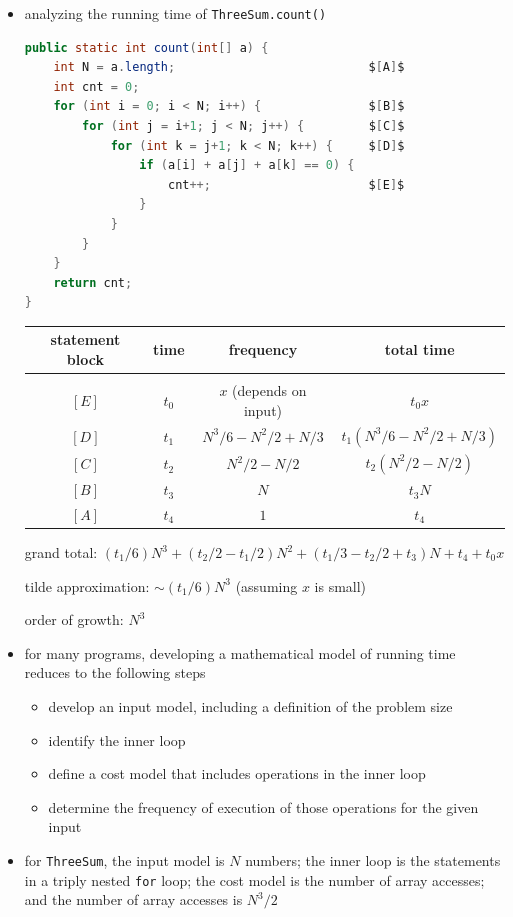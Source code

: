 \documentclass[8pt,a4paper,compress]{beamer}
\begin{document}
\begin{frame}[fragile]
\begin{itemize}
\item analyzing the running time of \lstinline{ThreeSum.count()}
\begin{lstlisting}[language=Java, mathescape]
public static int count(int[] a) {
    int N = a.length;                           $[A]$
    int cnt = 0;
    for (int i = 0; i < N; i++) {               $[B]$ 
        for (int j = i+1; j < N; j++) {         $[C]$
            for (int k = j+1; k < N; k++) {     $[D]$
                if (a[i] + a[j] + a[k] == 0) {
                    cnt++;                      $[E]$
                }
            }
        }
    }
    return cnt;
}
\end{lstlisting}
\begin{center}
\begin{tabular}{cccc}
\textbf{statement block} & \textbf{time} & \textbf{frequency} & \textbf{total time}\\ \hline \\
$[E]$ & $t_0$ & $x$ (depends on input) & $t_0x$ \\
$[D]$ & $t_1$ & $N^3/6-N^2/2+N/3$  & $t_1(N^3/6-N^2/2+N/3)$ \\
$[C]$ & $t_2$ & $N^2/2-N/2$  & $t_2(N^2/2-N/2)$ \\
$[B]$ & $t_3$ & $N$  & $t_3N$ \\
$[A]$ & $t_4$ & $1$  & $t_4$ 
\end{tabular} 
\end{center}
grand total: $(t_1/6)N^3+(t_2/2-t_1/2)N^2+(t_1/3-t_2/2+t_3)N+t_4+t_0x$

tilde approximation: $\sim(t_1/6)N^3$ (assuming $x$ is small)

order of growth: $N^3$
\end{itemize}
\end{frame}

\begin{frame}[fragile]
\begin{itemize}
\item for many programs, developing a mathematical model of running time reduces to the following steps
\begin{itemize}
\item develop an input model, including a definition of the problem size
\item identify the inner loop
\item define a cost model that includes operations in the inner loop
\item determine the frequency of execution of those operations for the given input
\end{itemize}

\item for \lstinline{ThreeSum}, the input model is $N$ numbers; the inner loop is the statements in a triply nested \lstinline{for} loop; the cost model is the number of array accesses; and the number of array accesses is $N^3/2$
\end{itemize}
\end{frame}
\end{document}
